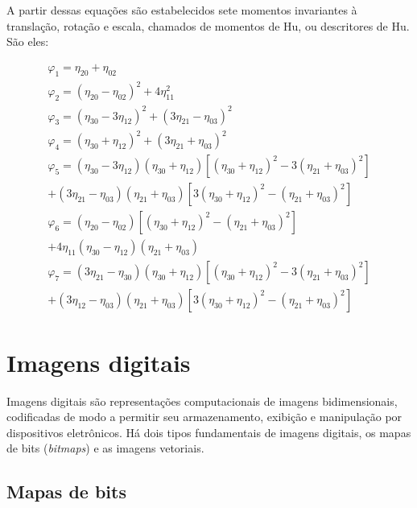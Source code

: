 A partir dessas equações são estabelecidos sete momentos invariantes à translação,
 rotação e escala, chamados de momentos de Hu, ou descritores de Hu. São eles:

\begin{subequations}\label{eq:mmt}
\begin{align}
  \varphi_1 = \eta_{20} + \eta_{02} \\
  \varphi_2 = (\eta_{20} - \eta_{02})^2 + 4\eta_{11}^2 \\
  \varphi_3 = (\eta_{30} - 3\eta_{12})^2 + (3\eta_{21} - \eta_{03})^2 \\
  \varphi_4 = (\eta_{30} + \eta_{12})^2 + (3\eta_{21} + \eta_{03})^2 \\
%
  \varphi_5 = (\eta_{30} - 3\eta_{12})(\eta_{30} + \eta_{12})
               \left[ (\eta_{30} + \eta_{12})^2 - 3(\eta_{21} + \eta_{03})^2 \right] \\
              + (3\eta_{21} - \eta_{03})(\eta_{21} + \eta_{03})
               \left[ 3(\eta_{30} + \eta_{12})^2 - (\eta_{21} + \eta_{03})^2 \right] \\
%
  \varphi_6 = (\eta_{20} - \eta_{02})
               \left[ (\eta_{30} + \eta_{12})^2 - (\eta_{21} + \eta_{03})^2 \right] \\
              + 4\eta_{11}(\eta_{30} - \eta_{12})(\eta_{21} + \eta_{03}) \\
%
  \varphi_7 = (3\eta_{21} - \eta_{30})(\eta_{30} + \eta_{12})
               \left[ (\eta_{30} + \eta_{12})^2 - 3(\eta_{21} + \eta_{03})^2 \right] \\
              + (3\eta_{12} - \eta_{03})(\eta_{21} + \eta_{03})
               \left[ 3(\eta_{30} + \eta_{12})^2 - (\eta_{21} + \eta_{03})^2 \right]
\end{align}
\end{subequations}

\section{Imagens digitais}\label{sec:img_dig}

Imagens digitais são representações computacionais de imagens bidimensionais,
codificadas de modo a permitir seu armazenamento, exibição e manipulação por
dispositivos eletrônicos. Há dois tipos fundamentais de imagens digitais,
os mapas de bits (\textit{bitmaps}) e as imagens vetoriais.

\subsection{Mapas de bits}

